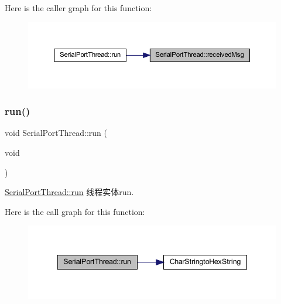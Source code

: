 Here is the caller graph for this function\+:
\nopagebreak
\begin{figure}[H]
\begin{center}
\leavevmode
\includegraphics[width=350pt]{class_serial_port_thread_ac076c2d960a1464de8e88e703ad00dc5_icgraph}
\end{center}
\end{figure}
\mbox{\label{class_serial_port_thread_ab0cafe85015c88354c9c5b8f7b3f1282}} 
\subsubsection{\texorpdfstring{run()}{run()}}
{\footnotesize\ttfamily void Serial\+Port\+Thread\+::run (\begin{DoxyParamCaption}\item[{void}]{ }\end{DoxyParamCaption})\hspace{0.3cm}{\ttfamily [protected]}}



\mbox{\hyperlink{class_serial_port_thread_ab0cafe85015c88354c9c5b8f7b3f1282}{Serial\+Port\+Thread\+::run}} 线程实体run. 

Here is the call graph for this function\+:
\nopagebreak
\begin{figure}[H]
\begin{center}
\leavevmode
\includegraphics[width=338pt]{class_serial_port_thread_ab0cafe85015c88354c9c5b8f7b3f1282_cgraph}
\end{center}
\end{figure}
\mbox{\label{class_serial_port_thread_afe967fd379bdd7b5d7cb90292ff18c32}} 
